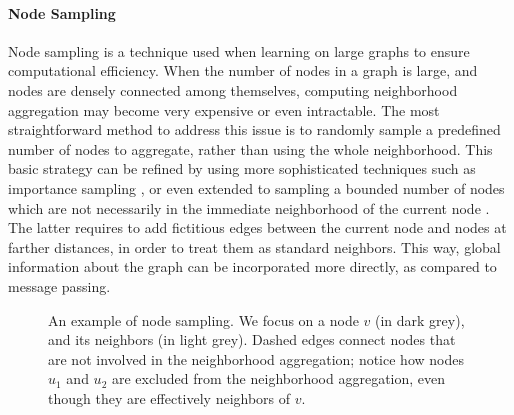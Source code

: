 \paragraph{Node Sampling}
Node sampling is a technique used when learning on large graphs to ensure computational efficiency. When the number of nodes in a graph is large, and nodes are densely connected among themselves, computing neighborhood aggregation may become very expensive or even intractable. The most straightforward method to address this issue is to randomly sample a predefined number of nodes to aggregate, rather than using the whole neighborhood. This basic strategy can be refined by using more sophisticated techniques such as importance sampling \citep{gallicchio2020fastdeepgnn}, or even extended to sampling a bounded number of nodes which are not necessarily in the immediate neighborhood of the current node \citep{hamilton2017graphsage}. The latter requires to add fictitious edges between the current node and nodes at farther distances, in order to treat them as standard neighbors. This way, global information about the graph can be incorporated more directly, as compared to message passing.

\begin{figure}[h!]
    \centering
    \resizebox{.35\textwidth}{!}{}
    \caption{An example of node sampling. We focus on a node $v$ (in dark grey), and its neighbors (in light grey). Dashed edges connect nodes that are not involved in the neighborhood aggregation; notice how nodes $u_1$ and $u_2$ are excluded from the neighborhood aggregation, even though they are effectively neighbors of $v$.}
    \label{fig:sampling}
\end{figure}

